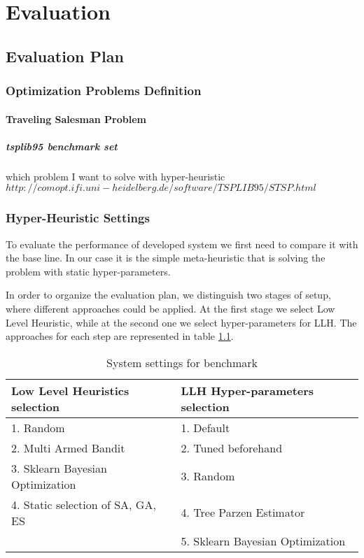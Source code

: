 \chapter{Evaluation}


\section{Evaluation Plan}

\subsection{Optimization Problems Definition}
\subsubsection{Traveling Salesman Problem}
\paragraph{tsplib95 benchmark set}
which problem I want to solve with hyper-heuristic
$http://comopt.ifi.uni-heidelberg.de/software/TSPLIB95/STSP.html$

\subsection{Hyper-Heuristic Settings}
To evaluate the performance of developed system we first need to compare it with the base line. In our case it is the simple meta-heuristic that is solving the problem with static hyper-parameters.

In order to organize the evaluation plan, we distinguish two stages of setup, where different approaches could be applied. 
At the first stage we select Low Level Heuristic, while at the second one we select hyper-parameters for LLH.
The approaches for each step are represented in table \ref{evaluation: settings table}.


\begin{table}[h!]
	\centering
	\begin{tabular}{|l|l|}
		\hline
		\textbf{Low Level Heuristics selection} & \textbf{LLH Hyper-parameters selection} \\
		\hline
		1. Random & 1. Default \\
		2. Multi Armed Bandit & 2. Tuned beforehand \\
		3. Sklearn Bayesian Optimization & 3. Random \\
		4. Static selection of SA, GA, ES & 4. Tree Parzen Estimator \\
		& 5. Sklearn Bayesian Optimization\\
		\hline
	\end{tabular}
	
	\caption{System settings for benchmark}
	\label{evaluation: settings table}
\end{table}


